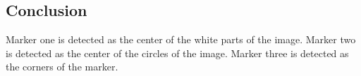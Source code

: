 \subsection{Conclusion}
Marker one is detected as the center of the white parts of the image.
Marker two is detected as the center of the circles of the image.
Marker three is detected as the corners of the marker.